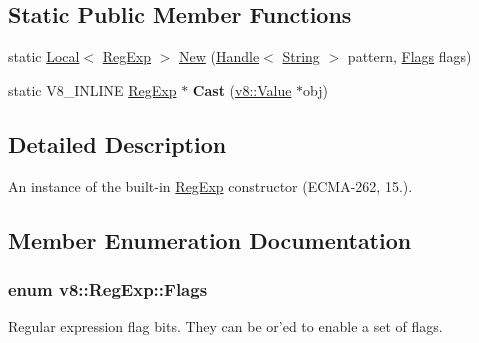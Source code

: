 \subsection*{Static Public Member Functions}
\begin{DoxyCompactItemize}
\item 
static \hyperlink{classv8_1_1Local}{Local}$<$ \hyperlink{classv8_1_1RegExp}{Reg\-Exp} $>$ \hyperlink{classv8_1_1RegExp_ac92fcff5a40cf8c698aefd021c823c2e}{New} (\hyperlink{classv8_1_1Handle}{Handle}$<$ \hyperlink{classv8_1_1String}{String} $>$ pattern, \hyperlink{classv8_1_1RegExp_aa4718a5c1f18472aff3bf51ed694fc5a}{Flags} flags)
\item 
\hypertarget{classv8_1_1RegExp_ac06d8f61c0ebb2e7292e6aeff7108f26}{static V8\-\_\-\-I\-N\-L\-I\-N\-E \hyperlink{classv8_1_1RegExp}{Reg\-Exp} $\ast$ {\bfseries Cast} (\hyperlink{classv8_1_1Value}{v8\-::\-Value} $\ast$obj)}\label{classv8_1_1RegExp_ac06d8f61c0ebb2e7292e6aeff7108f26}

\end{DoxyCompactItemize}


\subsection{Detailed Description}
An instance of the built-\/in \hyperlink{classv8_1_1RegExp}{Reg\-Exp} constructor (E\-C\-M\-A-\/262, 15.). 

\subsection{Member Enumeration Documentation}
\hypertarget{classv8_1_1RegExp_aa4718a5c1f18472aff3bf51ed694fc5a}{
\subsubsection[{Flags}]{\setlength{\rightskip}{0pt plus 5cm}enum {\bf v8\-::\-Reg\-Exp\-::\-Flags}}}\label{classv8_1_1RegExp_aa4718a5c1f18472aff3bf51ed694fc5a}
Regular expression flag bits. They can be or'ed to enable a set of flags. 

